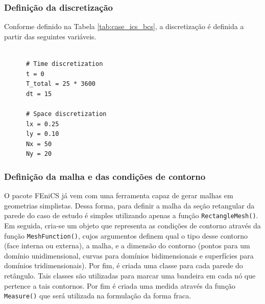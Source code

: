     \subsubsection{Definição da discretização}
    Conforme definido na Tabela \ref{tab:case_ics_bcs}, a discretização é
    definida a partir das seguintes variáveis.
    
    \begin{verbatim}
      
      # Time discretization
      t = 0
      T_total = 25 * 3600
      dt = 15
      
      # Space discretization
      lx = 0.25
      ly = 0.10
      Nx = 50
      Ny = 20
    \end{verbatim} 

    \subsubsection{Definição da malha e das condições de contorno}
    O pacote FEniCS já vem com uma ferramenta capaz de gerar malhas em
    geometrias simplistas. Dessa forma, para definir a malha da seção retangular
    da parede do caso de estudo é simples utilizando apenas a função
    \texttt{RectangleMesh()}. Em seguida, cria-se um
    objeto que representa as condições de contorno através da função
    \texttt{MeshFunction()}, cujos argumentos definem
    qual o tipo desse contorno (face interna ou externa), a malha, e a dimensão
    do contorno (pontos para um domínio unidimensional, curvas para domínios
    bidimensionais e superfícies para domínios tridimensionais). Por fim, é
    criada uma classe para cada parede do retângulo. Tais classes são utilizadas
    para marcar uma bandeira em cada nó que pertence a tais contornos. Por fim é
    criada uma medida através da função \texttt{Measure()} que será utilizada na formulação da forma fraca.
    
